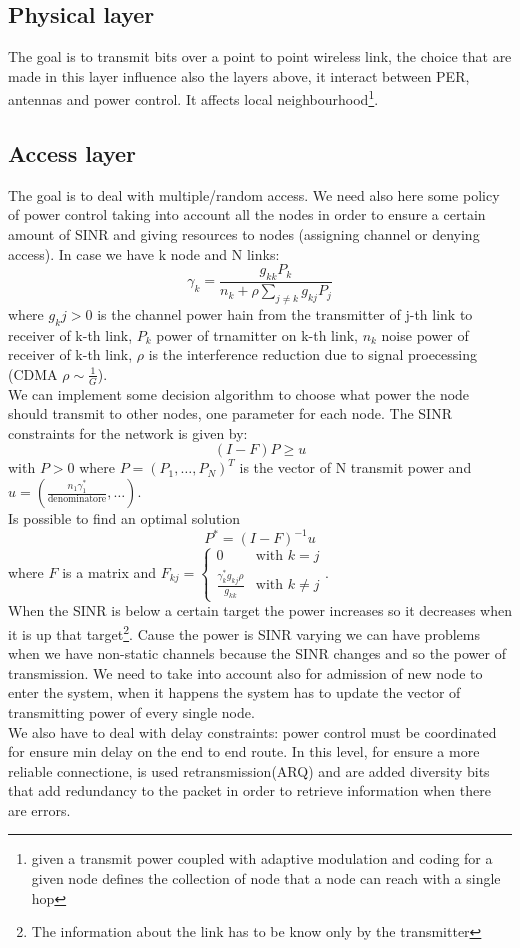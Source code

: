 \subsection{Physical layer}
The goal is to transmit bits over a point to point wireless link, the choice that are made in this layer influence also the layers above, it interact between PER, antennas and power control. It affects local neighbourhood\footnote{given a transmit power coupled with adaptive modulation and coding for a given node defines the collection of node that a node can reach with a single hop}.

\subsection{Access layer}
The goal is to deal with multiple/random access. We need also here some policy of  power control taking into account all the nodes in order to ensure a certain amount of SINR and giving resources to nodes (assigning channel or denying access). In case we have k node and N links:
	$$\gamma_k=\frac{g_{kk}P_k}{n_k+\rho\sum_{j\ne k}g_{kj}P_j}$$
where $ g_kj>0 $ is the channel power hain from the transmitter of j-th link to receiver of k-th link, $ P_k $ power of trnamitter on k-th link, $ n_k $ noise power of receiver of k-th link, $ \rho $ is the interference reduction due to signal proecessing (CDMA $ \rho\sim\frac{1}{G} $).\\
We can implement some decision algorithm to choose what power the node should transmit to other nodes, one parameter for each node. The SINR constraints for the network is given by:
	$$ (I-F)P\ge u $$
with $ P>0 $ where $ P=(P_1,\dots,P_N)^T $ is the vector of N transmit power and $ u=(\frac{n_1\gamma_1^*}{\text{denominatore}},\dots) $.\\
Is possible to find an optimal solution
$$P^*=(I-F)^{-1}u$$
where $ F $ is a matrix and $ F_{kj}=\begin{cases}0& \text{with } k=j\\ \frac{\gamma_k^*g_{kj}\rho}{g_{kk}} &\text{with } k\ne j\end{cases} $.\\
When the SINR is below a certain target the power increases so it decreases when it is up that target\footnote{The information about the link has to be know only by the transmitter}. Cause the power is SINR varying we can have problems when we have non-static channels because the SINR changes and so the power of transmission. We need to take into account also for admission of new node to enter the system, when it happens the system has to update the vector of transmitting power of every single node.\\
We also have to deal with delay constraints: power control must be coordinated for ensure min delay on the end to end route. In this level, for ensure a more reliable connectione, is used retransmission(ARQ) and are added diversity bits that add redundancy to the packet in order to retrieve information when there are errors.

